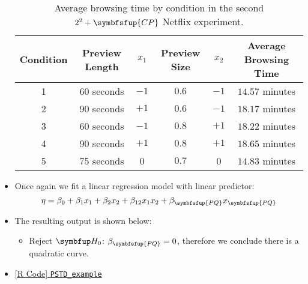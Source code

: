 \begin{itemize}
          \begin{table}[!htbp]
              \centering
              \caption{Average browsing time by condition in the second $2^2 + \symbfsfup{CP}$ Netflix experiment.}\label{tab:netflixtab3}
              \begin{tabular}{cccccc}
                  \toprule Condition & Preview Length & $x_{1}$ & Preview Size & $x_{2}$ & Average Browsing Time \\
                  \midrule 1         & 60 seconds     & $-1$    & $0.6$        & $-1$    & $14.57$ minutes       \\
                  2                  & 90 seconds     & $+1$    & $0.6$        & $-1$    & $18.17$ minutes       \\
                  3                  & 60 seconds     & $-1$    & $0.8$        & $+1$    & $18.22$ minutes       \\
                  4                  & 90 seconds     & $+1$    & $0.8$        & $+1$    & $18.65$ minutes       \\
                  5                  & 75 seconds     & 0       & $0.7$        & 0       & $14.83$ minutes       \\
                  \bottomrule
              \end{tabular}
          \end{table}
    \item Once again we fit a linear regression model with linear predictor:
          \[ \eta=\beta_0+\beta_1x_1+\beta_2x_2+\beta_{12}x_1x_2+\beta_{\symbfsfup{PQ}}x_{\symbfsfup{PQ}} \]
    \item The resulting output is shown below:
          
          \begin{itemize}
              \item Reject $ \HN $: $ \beta_{\symbfsfup{PQ}}=0 $, therefore we conclude there is a quadratic curve.
          \end{itemize}
    \item \href{https://github.com/Hextical/university-notes/blob/master/year-3/semester-3/STAT 430/code/W11/PSTD_example.R}{[R Code] \texttt{PSTD\_example}}
\end{itemize}
